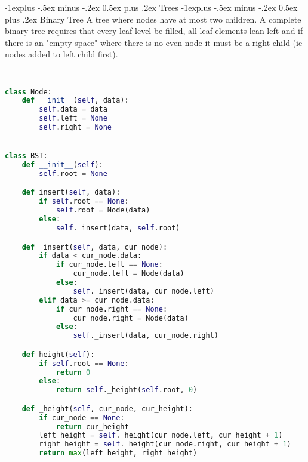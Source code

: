 \documentclass[letterpaper, 8pt]{extarticle}
\makeatletter
\renewcommand{\section}{\@startsection{section}{1}{0mm}%
                                {-1explus -.5ex minus -.2ex}%
                                {0.5ex plus .2ex}%
                                {\normalfont\normalsize\bfseries}}
\renewcommand{\subsection}{\@startsection{subsection}{2}{0mm}%
                                {-1explus -.5ex minus -.2ex}%
                                {0.5ex plus .2ex}%
                                {\normalfont\small\bfseries}}
\makeatother
\begin{document}
\begin{multicols*}{5}



\section{Trees}
\subsection{Binary Tree}
A tree where nodes have at most two children. A complete binary tree requires that every leaf level be filled, all leaf elements lean left and if there is an "empty space" where there is no even node it must be a right child (ie nodes added to left child first).
\begin{lstlisting}[language=Python, breaklines=true, postbreak=\mbox{\textcolor{red}{$\hookrightarrow$}\space}]
    

class Node:
    def __init__(self, data):
        self.data = data
        self.left = None
        self.right = None


class BST:
    def __init__(self):
        self.root = None

    def insert(self, data):
        if self.root == None:
            self.root = Node(data)
        else:
            self._insert(data, self.root)

    def _insert(self, data, cur_node):
        if data < cur_node.data:
            if cur_node.left == None:
                cur_node.left = Node(data)
            else:
                self._insert(data, cur_node.left)
        elif data >= cur_node.data:
            if cur_node.right == None:
                cur_node.right = Node(data)
            else:
                self._insert(data, cur_node.right)

    def height(self):
        if self.root == None:
            return 0
        else:
            return self._height(self.root, 0)

    def _height(self, cur_node, cur_height):
        if cur_node == None:
            return cur_height
        left_height = self._height(cur_node.left, cur_height + 1)
        right_height = self._height(cur_node.right, cur_height + 1)
        return max(left_height, right_height)


\end{lstlisting}
\end{multicols*}
\end{document}
